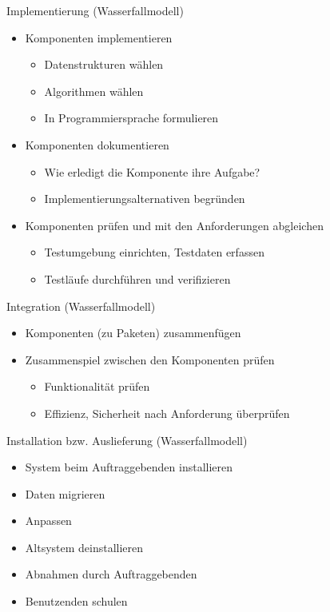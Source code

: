 \begin{bonus}{Implementierung (Wasserfallmodell)}
    \begin{itemize}
        \item Komponenten implementieren
              \begin{itemize}
                  \item Datenstrukturen wählen
                  \item Algorithmen wählen
                  \item In Programmiersprache formulieren
              \end{itemize}
        \item Komponenten dokumentieren
              \begin{itemize}
                  \item Wie erledigt die Komponente ihre Aufgabe?
                  \item Implementierungsalternativen begründen
              \end{itemize}
        \item Komponenten prüfen und mit den Anforderungen abgleichen
              \begin{itemize}
                  \item Testumgebung einrichten, Testdaten erfassen
                  \item Testläufe durchführen und verifizieren
              \end{itemize}
    \end{itemize}
\end{bonus}

\begin{bonus}{Integration (Wasserfallmodell)}
    \begin{itemize}
        \item Komponenten (zu Paketen) zusammenfügen
        \item Zusammenspiel zwischen den Komponenten prüfen
              \begin{itemize}
                  \item Funktionalität prüfen
                  \item Effizienz, Sicherheit nach Anforderung überprüfen
              \end{itemize}
    \end{itemize}
\end{bonus}

\begin{bonus}{Installation bzw. Auslieferung (Wasserfallmodell)}
    \begin{itemize}
        \item System beim Auftraggebenden installieren
        \item Daten migrieren
        \item Anpassen
        \item Altsystem deinstallieren
        \item Abnahmen durch Auftraggebenden
        \item Benutzenden schulen
    \end{itemize}
\end{bonus}

